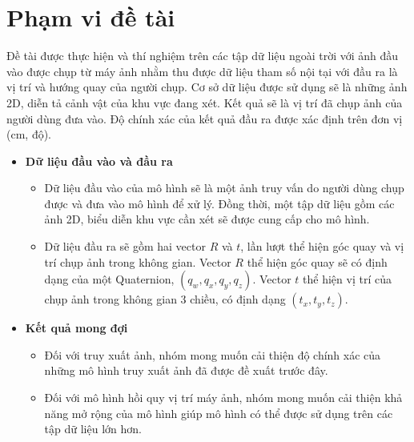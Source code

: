 \section{Phạm vi đề tài}
Đề tài được thực hiện và thí nghiệm trên các tập dữ liệu ngoài trời với ảnh đầu vào được chụp từ máy ảnh nhằm thu được dữ liệu tham số nội tại với đầu ra là vị trí và hướng quay của người chụp. Cơ sở dữ liệu được sử dụng sẽ là những ảnh 2D, diễn tả cảnh vật của khu vực đang xét. Kết quả sẽ là vị trí đã chụp ảnh của người dùng đưa vào. Độ chính xác của kết quả đầu ra được xác định trên đơn vị (cm, độ).
\begin{itemize}
    \item \textbf{Dữ liệu đầu vào và đầu ra}
    \begin{itemize}
        \item Dữ liệu đầu vào của mô hình sẽ là một ảnh truy vấn do người dùng chụp được và đưa vào mô hình để xử lý. Đồng thời, một tập dữ liệu gồm các ảnh 2D, biểu diễn khu vực cần xét sẽ được cung cấp cho mô hình.
        \item Dữ liệu đầu ra sẽ gồm hai vector $R$ và $t$, lần lượt thể hiện góc quay và vị trí chụp ảnh trong không gian. Vector $R$ thể hiện góc quay sẽ có định dạng của một Quaternion, $(q_w,q_x,q_y,q_z)$. Vector $t$ thể hiện vị trí của chụp ảnh trong không gian 3 chiều, có định dạng $(t_x,t_y,t_z)$.
    \end{itemize}
    \item \textbf{Kết quả mong đợi}
    \begin{itemize}
        \item Đối với truy xuất ảnh, nhóm mong muốn cải thiện độ chính xác của những mô hình truy xuất ảnh đã được đề xuất trước đây.
        \item Đối với mô hình hồi quy vị trí máy ảnh, nhóm mong muốn cải thiện khả năng mở rộng của mô hình giúp mô hình có thể được sử dụng trên các tập dữ liệu lớn hơn.
    \end{itemize}
\end{itemize}

